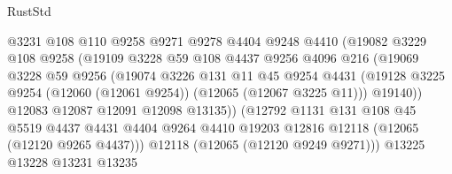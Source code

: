 \begin{lexlean}{RustStd}
\begin{coremodule}
                              @3231
                              @108
                              @110
                              @9258
                              @9271
                              @9278
                              @4404
                              @9248
                              @4410
                              (@19082
                                @3229
                                @108
                                @9258
                                (@19109
                                  @3228
                                  @59
                                  @108
                                  @4437
                                  @9256
                                  @4096
                                  @216
                                  (@19069
                                    @3228
                                    @59
                                    @9256
                                    (@19074
                                      @3226
                                      @131
                                      @11
                                      @45
                                      @9254
                                      @4431
                                      (@19128
                                        @3225
                                        @9254
                                        (@12060 (@12061 @9254))
                                        (@12065 (@12067 @3225 @11)))
                                      @19140))
                                  @12083
                                  @12087
                                  @12091
                                  @12098
                                  @13135))
                              (@12792
                                @1131
                                @131
                                @108
                                @45
                                @5519
                                @4437
                                @4431
                                @4404
                                @9264
                                @4410
                                @19203
                                @12816
                                @12118
                                (@12065 (@12120 @9265 @4437)))
                              @12118
                              (@12065 (@12120 @9249 @9271)))
                            @13225
                            @13228
                            @13231
                            @13235

\end{coremodule}
\end{lexlean}
